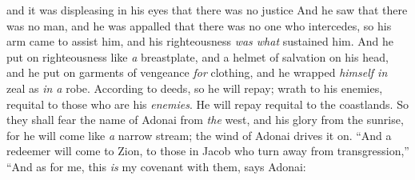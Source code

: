 \begin{biblechapter}
and it was displeasing in his eyes that there was no justice
\verse And he saw that there was no man, 
and he was appalled that there was no one who intercedes, 
so his arm came to assist him, 
and his righteousness \textit{was what} sustained him.
\verse And he put on righteousness like \textit{a} breastplate, 
and a helmet of salvation on his head, 
and he put on garments of vengeance \textit{for} clothing, 
and he wrapped \textit{himself in} zeal as \textit{in a} robe.
\verse According to deeds, so he will repay; 
wrath to his enemies, requital to those who are his \textit{enemies}. 
He will repay requital to the coastlands.
\verse So they shall fear the name of Adonai from \textit{the} west, 
and his glory from the sunrise, 
for he will come like \textit{a} narrow stream; 
the wind of Adonai drives it on.
\verse “And a redeemer will come to Zion, 
to those in Jacob who turn away from transgression,”
\verse “And as for me, this \textit{is} my covenant with them, says Adonai:
\end{biblechapter}

